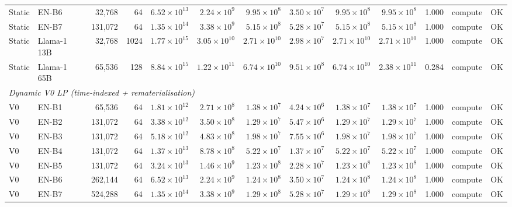\begin{table}[ht!]
{\begin{tabular}{llrrrrrrrrrll}
Static & EN-B6       &  32{,}768 &   64 & $6.52\times10^{13}$ & $2.24\times10^{9}$  & $9.95\times10^{8}$ & $3.50\times10^{7}$ & $9.95\times10^{8}$ & $9.95\times10^{8}$ & 1.000 & compute & OK \\
Static & EN-B7       & 131{,}072 &   64 & $1.35\times10^{14}$ & $3.38\times10^{9}$  & $5.15\times10^{8}$ & $5.28\times10^{7}$ & $5.15\times10^{8}$ & $5.15\times10^{8}$ & 1.000 & compute & OK \\
Static & Llama-1 13B &  32{,}768 & 1024 & $1.77\times10^{15}$ & $3.05\times10^{10}$ & $2.71\times10^{10}$& $2.98\times10^{7}$ & $2.71\times10^{10}$& $2.71\times10^{10}$& 1.000 & compute & OK \\
Static & Llama-1 65B &  65{,}536 &  128 & $8.84\times10^{15}$ & $1.22\times10^{11}$ & $6.74\times10^{10}$& $9.51\times10^{8}$ & $6.74\times10^{10}$& $2.38\times10^{11}$& 0.284 & compute & OK \\
\midrule
\multicolumn{13}{l}{\textit{Dynamic V0 LP (time-indexed + rematerialisation)}} \\
\midrule
V0 & EN-B1       &  65{,}536 &  64 & $1.81\times10^{12}$ & $2.71\times10^{8}$  & $1.38\times10^{7}$ & $4.24\times10^{6}$ & $1.38\times10^{7}$ & $1.38\times10^{7}$ & 1.000 & compute & OK \\
V0 & EN-B2       & 131{,}072 &  64 & $3.38\times10^{12}$ & $3.50\times10^{8}$  & $1.29\times10^{7}$ & $5.47\times10^{6}$ & $1.29\times10^{7}$ & $1.29\times10^{7}$ & 1.000 & compute & OK \\
V0 & EN-B3       & 131{,}072 &  64 & $5.18\times10^{12}$ & $4.83\times10^{8}$  & $1.98\times10^{7}$ & $7.55\times10^{6}$ & $1.98\times10^{7}$ & $1.98\times10^{7}$ & 1.000 & compute & OK \\
V0 & EN-B4       & 131{,}072 &  64 & $1.37\times10^{13}$ & $8.78\times10^{8}$  & $5.22\times10^{7}$ & $1.37\times10^{7}$ & $5.22\times10^{7}$ & $5.22\times10^{7}$ & 1.000 & compute & OK \\
V0 & EN-B5       & 131{,}072 &  64 & $3.24\times10^{13}$ & $1.46\times10^{9}$  & $1.23\times10^{8}$ & $2.28\times10^{7}$ & $1.23\times10^{8}$ & $1.23\times10^{8}$ & 1.000 & compute & OK \\
V0 & EN-B6       & 262{,}144 &  64 & $6.52\times10^{13}$ & $2.24\times10^{9}$  & $1.24\times10^{8}$ & $3.50\times10^{7}$ & $1.24\times10^{8}$ & $1.24\times10^{8}$ & 1.000 & compute & OK \\
V0 & EN-B7       & 524{,}288 &  64 & $1.35\times10^{14}$ & $3.38\times10^{9}$  & $1.29\times10^{8}$ & $5.28\times10^{7}$ & $1.29\times10^{8}$ & $1.29\times10^{8}$ & 1.000 & compute & OK \\

\end{tabular}}
\end{table}
